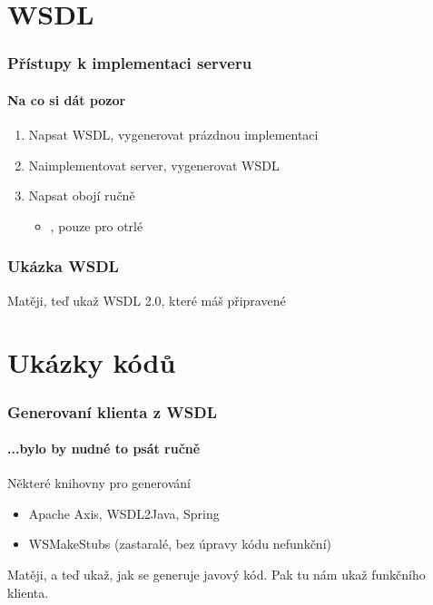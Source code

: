\documentclass[12pt]{beamer}
\begin{document}
\section{WSDL}

\begin{frame}
  \frametitle{Přístupy k implementaci serveru}
  \framesubtitle{Na co si dát pozor}

  \begin{enumerate}
    \item Napsat WSDL, vygenerovat prázdnou implementaci
    \vspace{4mm}
    \item Naimplementovat server, vygenerovat WSDL
    \vspace{4mm}
    \item Napsat obojí ručně
    \begin{itemize}
      \item {}, pouze pro otrlé
    \end{itemize}
  \end{enumerate}
\end{frame}

\begin{frame}
  \frametitle{Ukázka WSDL}

  \begin{example}
    Matěji, teď ukaž WSDL 2.0, které máš připravené
  \end{example}
\end{frame}

\section{Ukázky kódů}

\begin{frame}
  \frametitle{Generovaní klienta z WSDL}
  \framesubtitle{...bylo by nudné to psát ručně}

	\begin{block}{Některé knihovny pro generování}
		\begin{itemize}
			\item {} Apache Axis, WSDL2Java, Spring
			\item {} WSMakeStubs (zastaralé, bez úpravy kódu nefunkční)
		\end{itemize}    	
  \end{block}
	\begin{example}
		Matěji, a teď ukaž, jak se generuje javový kód. Pak tu nám ukaž funkčního klienta.
	\end{example}
\end{frame}
\end{document}
